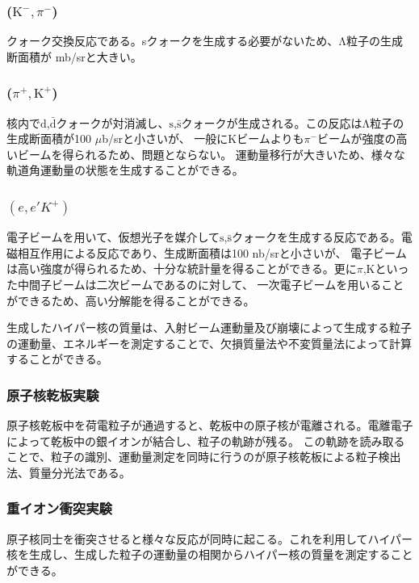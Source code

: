 \documentclass[a4paper,11pt,uplatex]{jsbook}
\begin{document}
\subsubsection{($\text{K}^-, \pi^-$)}
クォーク交換反応である。sクォークを生成する必要がないため、Λ粒子の生成断面積が mb/srと大きい。
\subsubsection{($\pi^+, \text{K}^+$)}
核内で$\text{d}$,$\bar{\text{d}}$クォークが対消滅し、$\text{s}$,$\bar{\text{s}}$クォークが生成される。この反応はΛ粒子の生成断面積が100 $\mu$b/srと小さいが、
一般にKビームよりも$\pi^-$ビームが強度の高いビームを得られるため、問題とならない。
運動量移行が大きいため、様々な軌道角運動量の状態を生成することができる。
\subsubsection{$(e,e'K^+)$}
電子ビームを用いて、仮想光子を媒介して$\text{s}$,$\bar{\text{s}}$クォークを生成する反応である。電磁相互作用による反応であり、生成断面積は100 nb/srと小さいが、
電子ビームは高い強度が得られるため、十分な統計量を得ることができる。更に$\pi$,Kといった中間子ビームは二次ビームであるのに対して、
一次電子ビームを用いることができるため、高い分解能を得ることができる。

生成したハイパー核の質量は、入射ビーム運動量及び崩壊によって生成する粒子の運動量、エネルギーを測定することで、欠損質量法や不変質量法によって計算することができる。
\subsubsection{原子核乾板実験}
原子核乾板中を荷電粒子が通過すると、乾板中の原子核が電離される。電離電子によって乾板中の銀イオンが結合し、粒子の軌跡が残る。
この軌跡を読み取ることで、粒子の識別、運動量測定を同時に行うのが原子核乾板による粒子検出法、質量分光法である。
\subsubsection{重イオン衝突実験}
原子核同士を衝突させると様々な反応が同時に起こる。これを利用してハイパー核を生成し、生成した粒子の運動量の相関からハイパー核の質量を測定することができる。
\end{document}
